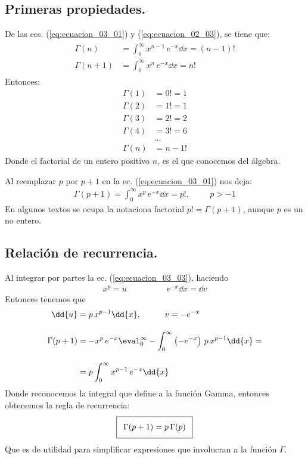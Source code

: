 \subsection{Primeras propiedades.}

De las ecs. (\ref{eq:ecuacion_03_01}) y (\ref{eq:ecuacion_02_03}), se tiene que:
\begin{align}
\begin{aligned}
\Gamma (n) &= \int_{0}^{\infty} x^{n-1} \, e^{-x} \dd{x} = (n -1)! \\[1em]
\Gamma (n+1) &= \int_{0}^{\infty} x^{n} \, e^{-x} \dd{x} = n!
\end{aligned}
\label{eq:ecuacion_03_02}
\end{align}
Entonces:
\begin{align*}
\Gamma (1) &= 0! = 1 \\
\Gamma (2) &= 1! = 1 \\
\Gamma (3) &= 2! = 2 \\
\Gamma (4) &= 3! = 6 \\
&\ldots \\
\Gamma (n) &= n-1!
\end{align*}
Donde el factorial de un entero positivo $n$, es el que conocemos del álgebra.
\par
Al reemplazar $p$ por $p+1$ en la ec. (\ref{eq:ecuacion_03_01}) nos deja:
\begin{align}
\Gamma (p+1) = \int_{0}^{\infty} x^{p} \, e^{-x} \dd{x} = p!, \hspace{1cm} p > -1
\label{eq:ecuacion_03_03}
\end{align}
En algunos textos se ocupa la notaciona factorial $p! = \Gamma (p+1)$, aunque $p$ es un no entero.

\subsection{Relación de recurrencia.}

Al integrar por partes la ec. (\ref{eq:ecuacion_03_03}), haciendo
\begin{align*}
x^{p} =  u \hspace{2cm} e^{-x} \dd{x} =  \dd{v}
\end{align*}
Entonces tenemos que
\begin{align*}
\dd{u} &= p \, x^{p-1} \dd{x}, \hspace{1cm} v = - e^{-x} \\[1em]
\Gamma (p+1) &= -x^{p} \, e^{-x} \displaystyle \eval_{0}^{\infty} - \displaystyle \int_{0}^{\infty} \left(-e^{-x} \right) \, p \, x^{p-1} \dd{x} = \\[1em]
&= p \displaystyle \int_{0}^{\infty} x^{p-1} \, e^{-x} \dd{x}
\end{align*}
Donde reconocemos la integral que define a la función Gamma, entonces obtenemos la regla de recurrencia:  
\begin{align}\addtolength{\fboxsep}{5pt}\boxed{
\Gamma (p+1) = p \, \Gamma (p)}
\label{eq:ecuacion_03_04}
\end{align}
Que es de utilidad para simplificar expresiones que involucran a la función $\Gamma$.

